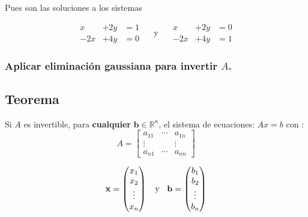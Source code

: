 \documentclass[
]{article}
\begin{document}
Pues son las soluciones a los sistemas

\begin{equation*}
  \begin{matrix}
           x  & +2 y  & = 1  \\
           -2x & +4 y   & = 0   
  \end{matrix} \quad \mbox{ y }\quad
  \begin{matrix}
           x  & +2 y  & = 0  \\
           -2x & +4 y   & = 1   
  \end{matrix}
\end{equation*}

\hypertarget{aplicar-eliminaciuxf3n-gaussiana-para-invertir-a.}{%
\subsubsection{\texorpdfstring{Aplicar eliminación gaussiana para
invertir
\(A\).}{Aplicar eliminación gaussiana para invertir A.}}\label{aplicar-eliminaciuxf3n-gaussiana-para-invertir-a.}}

\hypertarget{teorema}{%
\subsection{Teorema}\label{teorema}}

Si \(A\) es invertible, para \textbf{cualquier}
\(\mathbf{b}\in\mathbb{R}^{n}\), el sistema de ecuaciones: \(Ax =b\) con
: \begin{equation*}
A =   \left[
  \begin{matrix}
     a_{11}   & \cdots   & a_{1n} \\
    \vdots    &          & \vdots \\
      a_{n1}  & \cdots        & a_{nn}
  \end{matrix}
  \right]
\end{equation*}

\begin{equation*}
  \mathbf{x} =
    
  \begin{pmatrix}
     x_1 \\
     x_2 \\
     \vdots \\
     x_n
  \end{pmatrix}
     \hspace{.2cm}
   \mbox{  y  }
   \hspace{.2cm}  
   \mathbf{b} =
      \begin{pmatrix}
       b_1 \\
       b_2 \\
       \vdots \\
       b_n
    \end{pmatrix}
\end{equation*}
\end{document}
